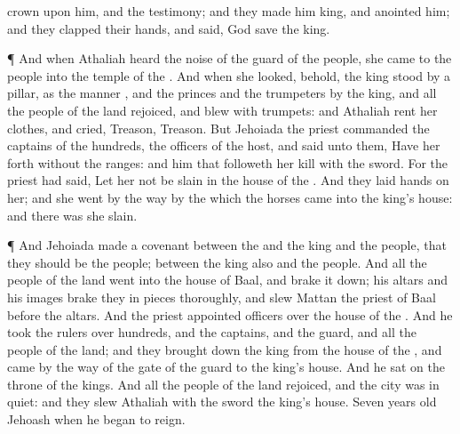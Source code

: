 {crown upon him, and
{} the
testimony; and they made him
king, and
anointed him; and they
clapped their
hands, and
said, God
save the
king.
\par }{\PP {}¶ And when
Athaliah
heard the
noise of the
guard
{} of the
people, she
came to the
people into the
temple of the
{}.
And when she
looked, behold, the
king
stood by a
pillar, as the
manner
{}, and the
princes and the
trumpeters by the
king, and all the
people of the
land
rejoiced, and
blew with
trumpets: and
Athaliah
rent her
clothes, and
cried,
Treason,
Treason.
But
Jehoiada the
priest
commanded the
captains of the
hundreds, the
officers of the
host, and
said unto them, Have her
forth
without the
ranges: and him that
followeth her
kill with the
sword. For the
priest had
said, Let her not be
slain in the
house of the
{}.
And they
laid
hands on her; and she
went by the
way by the which the
horses
came into the
king’s
house: and there was she
slain.
\par }{\PP {}¶ And
Jehoiada
made a
covenant between the
{} and the
king and the
people, that they should be the
{}
people; between the
king also and the
people.
And all the
people of the
land
went into the
house of
Baal, and brake it
down; his
altars and his
images brake they in
pieces
thoroughly, and
slew
Mattan the
priest of
Baal
before the
altars. And the
priest
appointed
officers over the
house of the
{}.
And he
took the
rulers over
hundreds, and the
captains, and the
guard, and all the
people of the
land; and they brought
down the
king from the
house of the
{}, and
came by the
way of the
gate of the
guard to the
king’s
house. And he
sat on the
throne of the
kings.
And all the
people of the
land
rejoiced, and the
city was in
quiet: and they
slew
Athaliah with the
sword
{} the
king’s
house.
Seven
years
old
{}
Jehoash when he began to
reign.

}

